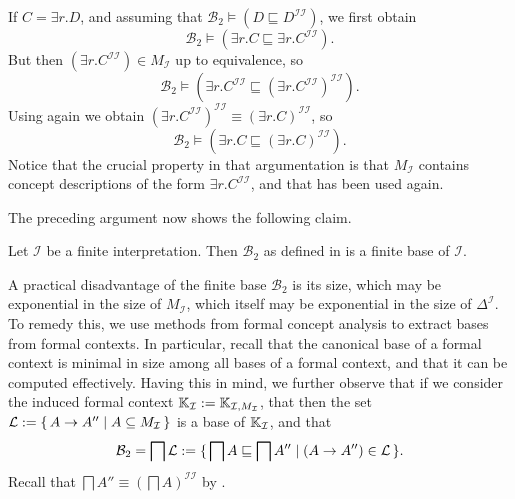 If $C = \exists r. D$, and assuming that $\mathcal{B}_2 \models (D \sqsubseteq
D^{\mathcal{I}\mathcal{I}})$, we first obtain
\begin{equation}
  \label{eq:22}
  \mathcal{B}_2 \models ( \exists r. C \sqsubseteq \exists r. C^{\mathcal{I}\mathcal{I}} ).
\end{equation}
But then $(\exists r. C^{\mathcal{I}\mathcal{I}}) \in M_{\mathcal{I}}$ up to equivalence,
so
\begin{equation*}
  \mathcal{B}_2 \models ( \exists r. C^{\mathcal{I}\mathcal{I}} \sqsubseteq (\exists
  r.C^{\mathcal{I}\mathcal{I}})^{\mathcal{I}\mathcal{I}}).  
\end{equation*}
Using  again we obtain $(\exists
r. C^{\mathcal{I}\mathcal{I}})^{\mathcal{I}\mathcal{I}} \equiv (\exists
r. C)^{\mathcal{I}\mathcal{I}}$, so
\begin{equation*}
  \mathcal{B}_2 \models ( \exists r. C \sqsubseteq (\exists r. C)^{\mathcal{I}\mathcal{I}} ).
\end{equation*}
Notice that the crucial property in that argumentation is that $M_{\mathcal{I}}$ contains
concept descriptions of the form $\exists r. C^{\mathcal{I}\mathcal{I}}$, and that
 has been used again.

The preceding argument now shows the following claim.

\begin{Theorem}
  \label{thm:Felix-base-B2}
  Let $\mathcal{I}$ be a finite interpretation.  Then $\mathcal{B}_2$ as defined in
   is a finite base of $\mathcal{I}$.
\end{Theorem}

A practical disadvantage of the finite base $\mathcal{B}_2$ is its size, which may be
exponential in the size of $M_{\mathcal{I}}$, which itself may be exponential in the size
of $\Delta^{\mathcal{I}}$.  To remedy this, we use methods from formal concept analysis to
extract bases from formal contexts.  In particular, recall that the canonical base of a
formal context is minimal in size among all bases of a formal context, and that it can be
computed effectively.  Having this in mind, we further observe that if we consider the
induced formal context ${\mathbb{K}}_{\mathcal{I}} := {\mathbb{K}}_{\mathcal{I}, M_{\mathcal{I}}}$,
that then the set $\mathcal{L} := {\{\, A \to A'' \mid A \subseteq M_{\mathcal{I}} \,\}}$ is a
  base of ${\mathbb{K}}_{\mathcal{I}}$, and that
\begin{equation*}
  \mathcal{B}_2 = \bigsqcap \mathcal{L} := {\{\, \bigsqcap A \sqsubseteq \bigsqcap A''
    \mid (A \to A'') \in \mathcal{L} \,\}}.
\end{equation*}
Recall that $\bigsqcap A'' \equiv (\bigsqcap A)^{\mathcal{I}\mathcal{I}}$ by
.

